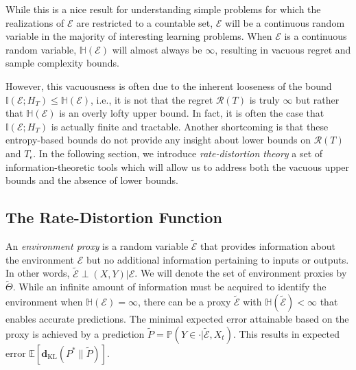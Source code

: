 \documentclass[twoside,11pt]{article}
\def\environment{\mathcal{E}}
\def\proxy{\tilde{\environment}}
\def\proxyset{\tilde{\Theta}}
\def\regret{\mathcal{R}}
\def\KL{\mathbf{d}_{\mathrm{KL}}}
\def\E{\mathbb{E}}
\def\H{\mathbb{H}}
\def\I{\mathbb{I}}
\def\Pr{\mathbb{P}}
\begin{document}
While this is a nice result for understanding simple problems for which the realizations of $\environment$ are restricted to a countable set, $\environment$ will be a continuous random variable in the majority of interesting learning problems. When $\environment$ is a continuous random variable, $\H(\environment)$ will almost always be $\infty$, resulting in vacuous regret and sample complexity bounds.

However, this vacuousness is often due to the inherent looseness of the bound $\I(\environment;H_T) \leq \H(\environment)$, i.e., it is not that the regret $\regret(T)$ is truly $\infty$ but rather that $\H(\environment)$ is an overly lofty upper bound. In fact, it is often the case that $\I(\environment;H_T)$ is actually finite and tractable. Another shortcoming is that these entropy-based bounds do not provide any insight about lower bounds on $\regret(T)$ and $T_\epsilon$. In the following section, we introduce \emph{rate-distortion theory} a set of information-theoretic tools which will allow us to address both the vacuous upper bounds and the absence of lower bounds.

\subsection{The Rate-Distortion Function}
An {\it environment proxy} is a random variable $\proxy$ that provides information about the environment $\environment$ but no additional information pertaining to inputs or outputs.  In other words, $\proxy \perp (X,Y) | \environment$.  We will denote the set of environment proxies by $\proxyset$.  While an infinite amount of information must be acquired to identify the environment when $\H(\environment) = \infty$, there can be a proxy $\proxy$ with $\H(\proxy) < \infty$ that enables accurate predictions.  The minimal expected error attainable based on the proxy is achieved by a prediction $\tilde{P} = \Pr(Y \in \cdot | \proxy, X_t)$.  This results in expected error $\E[\KL(P^* \| \tilde{P})]$.
\end{document}
